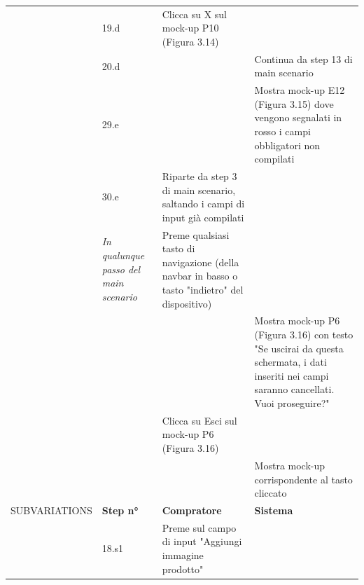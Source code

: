\begin{longtable}{|C{3.0cm}|C{1.3cm}|L{5.2cm}|L{5.2cm}|}
                        & 19.d
                        & Clicca su X sul mock-up P10 (Figura 3.14)
                        & \\
                        & 20.d
                        & 
                        & Continua da step 13 di main scenario\\
                \hline
                        & 29.e
                        & 
                        & Mostra mock-up E12 (Figura 3.15) dove vengono segnalati in rosso i campi obbligatori non compilati\\
                        & 30.e
                        & Riparte da step 3 di main scenario, saltando i campi di input già compilati
                        & \\
                \hline
                        & \textit{In qualunque passo del main scenario}
                        & Preme qualsiasi tasto di navigazione (della navbar in basso o tasto "indietro" del dispositivo)
                        & \\
                        & 
                        & 
                        & Mostra mock-up P6 (Figura 3.16) con testo "Se uscirai da questa schermata, i dati inseriti nei campi saranno cancellati. Vuoi proseguire?" \\
                        & 
                        & Clicca su Esci sul mock-up P6 (Figura 3.16)
                        & \\
                        & 
                        & 
                        & Mostra mock-up corrispondente al tasto cliccato\\
                \hline
                    SUBVARIATIONS
                    & \textbf{Step n°} 
                    & \textbf{Compratore} 
                    & \textbf{Sistema}\\
                \hline
                        & 18.s1
                        & Preme sul campo di input "Aggiungi immagine prodotto"

\end{longtable}
